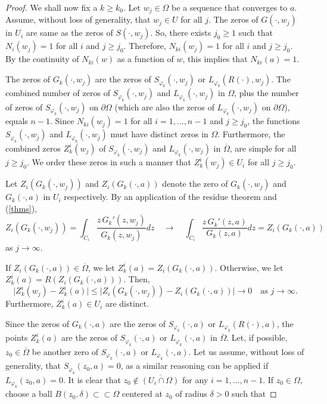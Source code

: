 \documentclass[10pt,a4paper]{amsart}
\newcommand{\Om}{\Omega}
\newcommand{\ov}{\overline}
\begin{document}
\begin{proof}
        \medskip
		
		We shall now fix a $k\geq k_0$. Let $w_j\in\Omega$ be a sequence that converges to $a$. Assume, without loss of generality, that $w_j\in U$ for all $j$. The zeros of $G(\cdot, w_j)$ in $U_i$ are same as the zeros of $S(\cdot, w_j)$. So, there exists $j_0 \ge 1$ such that $N_i(w_j) = 1$ for all $i$ and $j\geq j_0$. Therefore, $N_{ki}(w_j) = 1$ for all $i$ and $j\geq j_0$. By the continuity of $N_{ki}(w)$ as a function of $w$, this implies that $N_{ki}(a) = 1$.
		
		\medskip
		
		The zeros of $G_k(\cdot,w_j)$ are the zeros of $S_{\varphi_k}(\cdot,w_j)$ or $L_{\varphi_k}(R(\cdot),w_j)$. The combined number of zeros of $S_{\varphi_k}(\cdot, w_j)$ and $L_{\varphi_k}(\cdot, w_j)$ in $\Om$, plus the number of zeros of $S_{\varphi_k}(\cdot,w_j)$ on $\partial\Om$ (which are also the zeros of $L_{\varphi_k}(\cdot,w_j)$ on $\partial\Om$), equals $n-1$. Since $N_{ki}(w_j) =1$ for all $i=1,\ldots,n-1$ and $j\geq j_0$, the functions $S_{\varphi_k}(\cdot,w_j)$ and $L_{\varphi_k}(\cdot,w_j)$ must have distinct zeros in $\Om$. Furthermore, the combined zeros $Z^i_k(w_j)$ of $S_{\varphi_k}(\cdot,w_j)$ and $L_{\varphi_k}(\cdot,w_j)$ in $\overline{\Om}$, are simple for all $j\geq j_0$. We order these zeros in such a manner that $Z^i_k(w_j)\in U_i$ for all $j\geq j_0$.
		
		\medskip
		
		Let $Z_i(G_k(\cdot,w_j))$ and $Z_i(G_k(\cdot,a))$ denote the zero of $G_k(\cdot,w_j)$ and $G_k(\cdot,a)$ in $U_i$ respectively. By an application of the residue theorem and (\ref{thms}),
		\[
		Z_i(G_k(\cdot,w_j))= \int_{C_i} \frac{z\,{G_k}'(z, w_j)}{G_k(z,w_j)} dz 
		\quad 
		\rightarrow
		\quad
		\int_{C_i}  \frac{z\,{G_k}'(z, a)}{G_k(z,a)} dz 
		=
		Z_i(G_k(\cdot,a))
        \]
		as $j\rightarrow\infty$.

    \medskip
        
		If $Z_i(G_k(\cdot,a))\in \ov{\Om}$, we let $Z^i_k(a) = Z_i(G_k(\cdot,a))$. Otherwise, we let $Z^i_k(a) = R(Z_i(G_k(\cdot,a)))$. Then, 
		\[
		\lvert Z^{i}_k(w_j)- Z^i_k(a) \vert 
		\leq 
		\vert Z_i(G_k(\cdot,w_j))- Z_i(G_k(\cdot,a)) \vert
		\rightarrow 0
		\quad
		\text{as }j\rightarrow\infty.
		\]
		Furthermore, $Z^i_k(a)\in U_i$ are distinct.
		
		\medskip
		
		Since the zeros of $G_k(\cdot,a)$ are the zeros of $S_{\varphi_k}(\cdot,a)$ or $L_{\varphi_k}(R(\cdot),a)$, the points $Z^i_k(a)$ are the zeros of $S_{\varphi_k}(\cdot,a)$ or $L_{\varphi_k}(\cdot,a)$ in $\overline{\Om}$. Let, if possible, $z_0\in\ov{\Om}$ be another zero of $S_{\varphi_k}(\cdot,a)$ or $L_{\varphi_k}(\cdot,a)$. Let us assume, without loss of generality, that $S_{\varphi_k}(z_0,a) = 0$, as a similar reasoning can be applied if $L_{\varphi_k}(z_0,a)=0$.  It is clear that $z_0\notin \overline{(U_i\cap \Om)}$ for any $i=1,\ldots,n-1$. If $z_0\in\Om$, choose a ball $B(z_0,\delta)\subset\subset\Om$ centered at $z_0$ of radius $\delta>0$ such that 
		

\end{proof}
\end{document}

